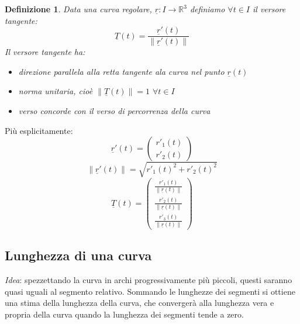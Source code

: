 \documentclass{scrreprt}
\newtheorem{defn}{Definizione}
\newenvironment{definition}{\begin{mdframed}[backgroundcolor=Ivory2]\begin{defn}}{\end{defn}\end{mdframed}}
\begin{document}

\begin{definition}
	Data una curva regolare, $\underline{r} : I \rightarrow \mathbb{R}^3$ definiamo $\forall t \in I$ il versore tangente:
	\begin{equation}
		\underline{T}(t) = \frac{\underline{r}'(t)}{\left\lVert \underline{r}'(t)\right\rVert }
	\end{equation}
	Il versore tangente ha:
	\begin{itemize}
		\item direzione parallela alla retta tangente ala curva nel punto $\underline{r}(t)$
		\item norma unitaria, cioè $\left\lVert \underline{T}(t)\right\rVert = 1$ $\forall t \in I$
		\item verso concorde con il verso di percorrenza della curva
	\end{itemize}
\end{definition}
Più esplicitamente:
\begin{equation}
	\underline{r}'(t) = \left( \begin{array}{c} r'_1(t) \\ r'_2(t) \end{array} \right) 
\end{equation}
\begin{equation}
	\left\lVert \underline{r}'(t) \right\rVert = \sqrt{r'_1(t)^2 + r'_2(t)^2}
\end{equation}
\begin{equation}
	\underline{T}(t) = \left(\begin{array}{c}
	\frac{r'_1(t)}{\left\lVert \underline{r}(t)\right\rVert }\\[2ex] %
	\frac{r'_2(t)}{\left\lVert \underline{r}(t)\right\rVert }\\[2ex] %
	\frac{r'_3(t)}{\left\lVert \underline{r}(t)\right\rVert }
	\end{array}\right)
\end{equation}

\subsection{Lunghezza di una curva}
\emph{Idea}: spezzettando la curva in archi progressivamente più piccoli, questi saranno quasi uguali al segmento relativo. Sommando le lunghezze dei segmenti si ottiene una stima della lunghezza della curva, che convergerà alla lunghezza vera e propria della curva quando la lunghezza dei segmenti tende a zero.\\
\end{document}
